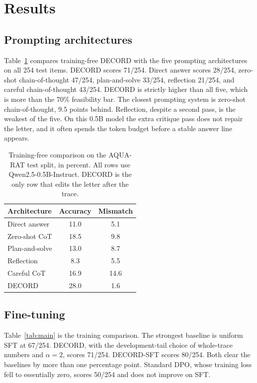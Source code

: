 \documentclass[11pt]{article}
\begin{document}
\section{Results}
\label{sec:results}

\subsection{Prompting architectures}

Table~\ref{tab:prompt} compares training-free DECORD with the five prompting architectures on all 254 test items.
DECORD scores 71/254.
Direct answer scores 28/254, zero-shot chain-of-thought 47/254, plan-and-solve 33/254, reflection 21/254, and careful chain-of-thought 43/254.
DECORD is strictly higher than all five, which is more than the 70\% feasibility bar.
The closest prompting system is zero-shot chain-of-thought, 9.5 points behind.
Reflection, despite a second pass, is the weakest of the five.
On this 0.5B model the extra critique pass does not repair the letter, and it often spends the token budget before a stable answer line appears.

\begin{table}[t]
\centering
\small
\begin{tabular}{lcc}
\toprule
Architecture & Accuracy & Mismatch \\
\midrule
Direct answer & 11.0 & 5.1 \\
Zero-shot CoT & 18.5 & 9.8 \\
Plan-and-solve & 13.0 & 8.7 \\
Reflection & 8.3 & 5.5 \\
Careful CoT & 16.9 & 14.6 \\
DECORD & 28.0 & 1.6 \\
\bottomrule
\end{tabular}
\caption{Training-free comparison on the AQUA-RAT test split, in percent. All rows use Qwen2.5-0.5B-Instruct. DECORD is the only row that edits the letter after the trace.}
\label{tab:prompt}
\end{table}

\subsection{Fine-tuning}

Table~\ref{tab:main} is the training comparison.
The strongest baseline is uniform SFT at 67/254.
DECORD, with the development-tail choice of whole-trace numbers and \(\alpha=2\), scores 71/254.
DECORD-SFT scores 80/254.
Both clear the baselines by more than one percentage point.
Standard DPO, whose training loss fell to essentially zero, scores 50/254 and does not improve on SFT.
\end{document}

